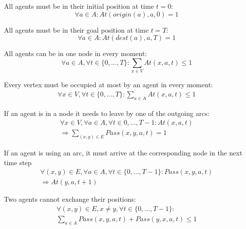 \documentclass[12pt, a4paper, hidelinks]{article}
\numberwithin{equation}{section}
\begin{document}
\begin{description}\label{equation_set_1}
\item All agents must be in their initial position at time $t = 0$:
\begin{equation}
\forall a \in A: At(origin(a), a, 0) = 1
\label{eq:1.1}\end{equation}

\item All agents must be in their goal position at time $t = T$:
\begin{equation}
\forall a \in A : At(dest(a), a, T) = 1
\label{eq:1.2}\end{equation}

\item All agents can be in one node in every moment:
\begin{equation}
\forall a \in A, \forall t \in \{0,\dots,T\}: \displaystyle\sum_{x \in V}At(x,a,t)\leq1
\label{eq:1.3}\end{equation}

\item Every vertex must be occupied at most by an agent in every moment:
\begin{equation}\begin{split}
\forall x \in V, \forall t \in \{0,\dots,T\}: \displaystyle\sum_{a \in A}At(x,a,t)\leq1
\end{split}\label{eq:1.4}\end{equation}

\item If an agent is in a node it needs to leave by one of the outgoing arcs:
\begin{equation}\begin{split}
\forall x \in V, \forall a \in A, \forall t \in {0,\dots,T-1}: At(x,a,t) \\
\Rightarrow  \displaystyle\sum_{(x,y) \in E}Pass(x,y,a,t)=1
\end{split}\label{eq:1.5}\end{equation}

\item If an agent is using an arc, it must arrive at the corresponding node in the next time step
\begin{equation}\begin{split}
\forall (x,y) \in E, \forall a \in A, \forall t \in \{0,\dots,T-1\}: Pass(x,y,a,t) \\
\Rightarrow At(y,a,t+1)
\end{split}\label{eq:1.6}
\end{equation}

\item Two agents cannot exchange their positions:
\begin{equation}\begin{split}
\forall (x,y) \in E, x \neq y, \forall t \in \{0,\dots,T-1\}: \\
\displaystyle\sum_{a \in A}Pass(x,y,a,t) + Pass(y,x,a,t) \leq 1
\end{split}\label{eq:1.7}\end{equation}
\end{description}
\end{document}
